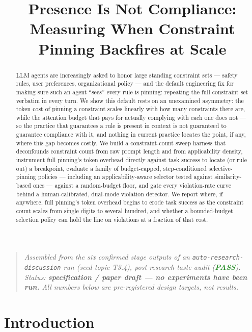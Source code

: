 \documentclass[11pt]{article}
\title{\textbf{Presence Is Not Compliance:\\ Measuring When Constraint Pinning Backfires at Scale}}
\author{}
\date{}
\begin{document}
\maketitle
\vspace{-2em}

\begin{quote}
\small\textit{Assembled from the six confirmed stage outputs of an \texttt{auto-research-discussion} run (seed topic T3.4), post research-taste audit (\textcolor{ForestGreen}{\textbf{PASS}}). Status: \textbf{specification / paper draft --- no experiments have been run.} All numbers below are pre-registered design targets, not results.}
\end{quote}

\begin{abstract}
LLM agents are increasingly asked to honor large standing constraint sets --- safety rules, user preferences, organizational policy --- and the default engineering fix for making sure such an agent ``sees'' every rule is pinning: repeating the full constraint set verbatim in every turn. We show this default rests on an unexamined asymmetry: the token cost of pinning a constraint scales linearly with how many constraints there are, while the attention budget that pays for actually complying with each one does not --- so the practice that guarantees a rule is present in context is not guaranteed to guarantee compliance with it, and nothing in current practice locates the point, if any, where this gap becomes costly. We build a constraint-count sweep harness that deconfounds constraint count from raw prompt length and from applicability density, instrument full pinning's token overhead directly against task success to locate (or rule out) a breakpoint, evaluate a family of budget-capped, step-conditioned selective-pinning policies --- including an applicability-aware selector tested against similarity-based ones --- against a random-budget floor, and gate every violation-rate curve behind a human-calibrated, dual-mode violation detector. We report where, if anywhere, full pinning's token overhead begins to erode task success as the constraint count scales from single digits to several hundred, and whether a bounded-budget selection policy can hold the line on violations at a fraction of that cost.
\end{abstract}

\section{Introduction}
\end{document}
